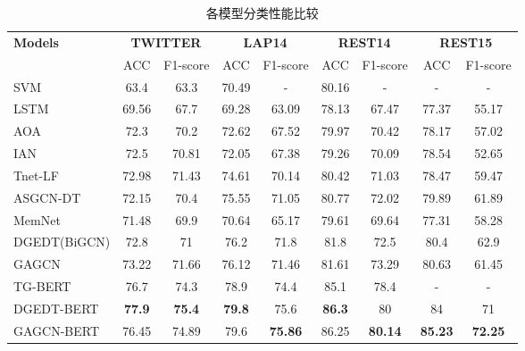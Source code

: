 \begin{table}[htb]
    \centering
    \caption{各模型分类性能比较}
    \renewcommand\arraystretch{1}
    \renewcommand\tabcolsep{2mm}
    \label{tab:gagcn-result}
    \begin{tabular}{lcccccccc}
    \hline
    \multirow{2}{*}{\textbf{Models}} & \multicolumn{2}{c}{\textbf{TWITTER}} & \multicolumn{2}{c}{\textbf{LAP14}} & \multicolumn{2}{c}{\textbf{REST14}} & \multicolumn{2}{c}{\textbf{REST15}}  \\
    \cline{2-9}
                            & ACC   & F1-score       & ACC   & F1-score        & ACC   & F1-score       & ACC   & F1-score          \\
    \hline
    SVM                 & 63.4 & 63.3         & 70.49 & -          & 80.16 & -         & -     & -                 \\
    LSTM                 & 69.56 & 67.7         & 69.28 & 63.09 & 78.13 & 67.47         & 77.37 & 55.17           \\
    AOA                     & 72.3 & 70.2         & 72.62 & 67.52          & 79.97 & 70.42         & 78.17 & 57.02            \\
    IAN                    & 72.5 & 70.81         & 72.05 & 67.38          & 79.26 & 70.09         & 78.54 & 52.65            \\
    Tnet-LF                 &72.98  & 71.43         & 74.61 & 70.14          & 80.42 & 71.03         & 78.47 & 59.47            \\
	ASGCN-DT                   & 72.15 & 70.4         & 75.55 & 71.05          & 80.77 & 72.02          & 79.89 & 61.89            \\
	MemNet                   & 71.48 & 69.9         & 70.64 & 65.17          & 79.61 & 69.64          & 77.31 & 58.28            \\
	DGEDT(BiGCN)                     & 72.8 & 71         & 76.2 & 71.8           & 81.8 & 72.5        & 80.4  & 62.9            \\
	GAGCN                     & 73.22 & 71.66         & 76.12 & 71.46           & 81.61 & 73.29         & 80.63  & 61.45           \\
    \hline
	TG-BERT                   & 76.7 & 74.3         & 78.9 & 74.4          & 85.1 & 78.4         & - & -            \\
	DGEDT-BERT                   & \textbf{77.9} & \textbf{75.4}         & \textbf{79.8} & 75.6          & \textbf{86.3} & 80         & 84 & 71            \\
	GAGCN-BERT                   & 76.45 & 74.89         & 79.6 & \textbf{75.86}         & 86.25 & \textbf{80.14}         & \textbf{85.23} & \textbf{72.25} \\
    \hline
    \end{tabular}
	\end{table}
	
